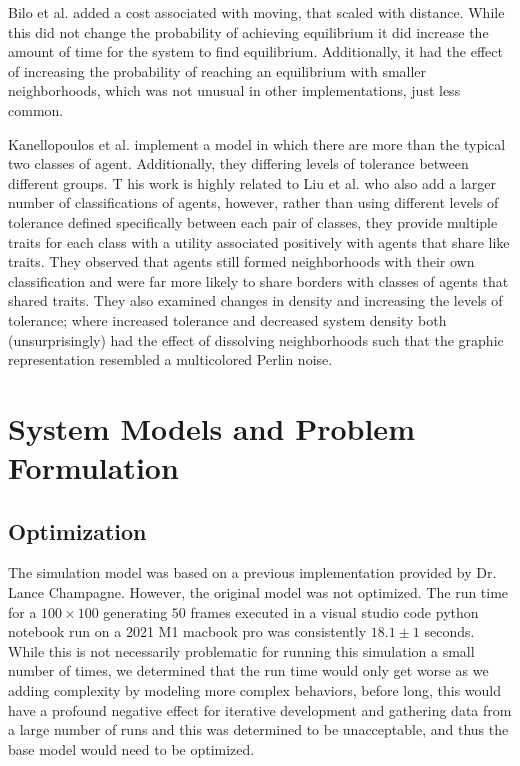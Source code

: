 \documentclass[sigplan,nonacm]{acmart}
\begin{document}
Bilo et al.\cite{Bilo2022} added a cost associated with moving, that scaled with distance.
While this did not change the probability of achieving equilibrium it did increase the amount
of time for the system to find equilibrium.
Additionally, it had the effect of increasing the probability of reaching an equilibrium with
smaller neighborhoods, which was not unusual in other implementations, just less common.

Kanellopoulos et al.\cite{Kanellopoulos2021} implement a model in which there are more than the typical two classes of agent.
Additionally, they differing levels of tolerance between different groups. T
his work is highly related to Liu et al.\cite{Liu2019} who also add a larger number of classifications of agents,
however, rather than using different levels of tolerance defined specifically between each pair of classes,
they provide multiple traits for each class with a utility associated positively with agents that share
like traits. They observed that agents still formed neighborhoods with their own classification and were far
more likely to share borders with classes of agents that shared traits.
They also examined changes in density and increasing the levels of tolerance; where increased tolerance
and decreased system density both (unsurprisingly) had the effect of dissolving neighborhoods such that
the graphic representation resembled a multicolored Perlin noise.


\section{System Models and Problem Formulation}
\subsection{Optimization}

The simulation model was based on a previous implementation provided by Dr. Lance Champagne.
However, the original model was not optimized.
The run time for a \(100\times100\) generating \(50\) frames executed in a visual studio code python notebook run
on a 2021 M1 macbook pro was consistently \(18.1\pm1\) seconds.
While this is not necessarily problematic for running this simulation a small number of times,
we determined that the run time would only get worse as we adding complexity by modeling more complex behaviors,
before long, this would have a profound negative effect for iterative development and gathering data from a large number of runs
and this was determined to be unacceptable, and thus the base model would need to be optimized.
\end{document}
